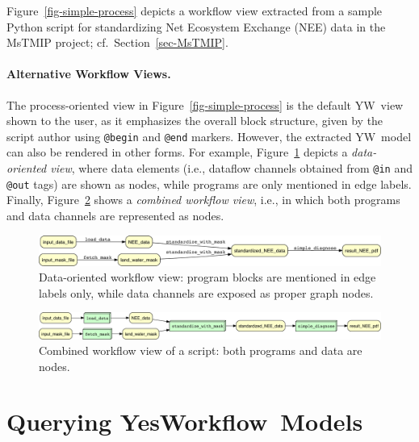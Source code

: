 \documentclass[15]{ijdc-v9}
\newcommand{\yw}{\textsf{YW}}
\newcommand{\YWT}{YesWorkflow}
\newcommand{\ywa}[1]{\texttt{\small #1}}
\newcommand{\figref}[1]{Figure~\ref{#1}}
\begin{document}
 \noindent \figref{fig-simple-process} depicts a workflow view
 extracted from a sample Python script for standardizing Net Ecosystem
 Exchange (NEE) data in the MsTMIP project; cf.~Section~\ref{sec-MsTMIP}.

\paragraph{Alternative Workflow Views.}
The process-oriented view in \figref{fig-simple-process} is the
default \yw\ view shown to the user, as it emphasizes the overall
block structure, given by the script author using \ywa{@begin} and
\ywa{@end} markers.  However, the extracted \yw\ model can also be
rendered in other forms.  For example, \figref{fig-simple-data}
depicts a \emph{data-oriented view}, where data elements (i.e.,
dataflow channels obtained from \ywa{@in} and \ywa{@out} tags) are
shown as nodes, while programs are only mentioned in edge labels.
Finally, \figref{fig-simple-combined} shows a \emph{combined workflow
  view}, i.e., in which both programs and data channels are
represented as nodes.

 \begin{figure}[t]
   \centering
   \includegraphics[width=1.0\textwidth]{figures/example_data-crop.pdf}
   \caption{Data-oriented workflow view: program blocks are mentioned
     in edge labels only, while data channels are exposed as proper
     graph nodes.}
   \label{fig-simple-data}
 \end{figure}

 \begin{figure}[h]
   \centering
   \includegraphics[width=1.0\textwidth]{figures/example_comb-crop.pdf}
   \caption{Combined workflow view of a script: both programs and data
   are nodes.}
   \label{fig-simple-combined}
 \end{figure}



\section{Querying \YWT\ Models}\label{sec-querying}
\end{document}

